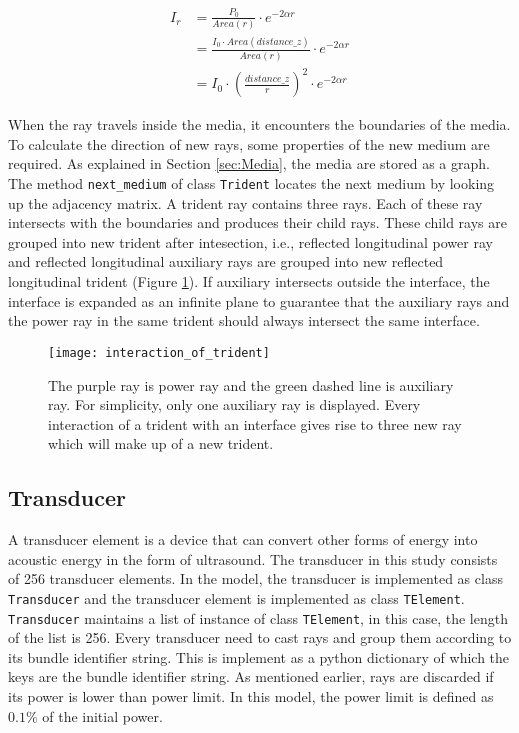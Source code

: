 \begin{equation} \label{eq:intensity_quadratically}
    \begin{aligned}
        I_r &= \frac{P_0}{Area(r)} \cdot e^{-2 \alpha r} \\
        &= \frac{I_0 \cdot Area(distance\_z)}{Area(r)} \cdot e^{-2 \alpha r} \\
        &= I_0 \cdot \left(\frac{distance\_z}{r}\right)^2 \cdot e^{-2 \alpha r}
    \end{aligned}
\end{equation}

When the ray travels inside the media, it encounters the boundaries of the media. To calculate the direction of new rays, some properties of the new medium are required. As explained in Section \ref{sec:Media}, the media are stored as a graph. The method \texttt{next\_medium} of class \texttt{Trident} locates the next medium by looking up the adjacency matrix. A trident ray contains three rays. Each of these ray intersects with the boundaries and produces their child rays. These child rays are grouped into new trident after intesection, i.e., reflected longitudinal power ray and reflected longitudinal auxiliary rays are grouped into new reflected longitudinal trident (Figure \ref{fig:interaction_of_trident}). If auxiliary intersects outside the interface, the interface is expanded as an infinite plane to guarantee that the auxiliary rays and the power ray in the same trident should always intersect the same interface.

\begin{figure}[h]
    \centering
    \texttt{[image: interaction\_of\_trident]}
    \caption{The purple ray is power ray and the green dashed line is auxiliary ray. For simplicity, only one auxiliary ray is displayed. Every interaction of a trident with an interface gives rise to three new ray which will make up of a new trident.}
    \label{fig:interaction_of_trident}
\end{figure}


\subsection{Transducer}
A transducer element is a device that can convert other forms of energy into acoustic energy in the form of ultrasound. The transducer in this study consists of 256 transducer elements. In the model, the transducer is implemented as class \texttt{Transducer} and the transducer element is implemented as class \texttt{TElement}. \texttt{Transducer} maintains a list of instance of class \texttt{TElement}, in this case, the length of the list is 256.
Every transducer need to cast rays and group them according to its bundle identifier string. This is implement as a python dictionary of which the keys are the bundle identifier string. As mentioned earlier, rays are discarded if its power is lower than power limit. In this model, the power limit is defined as $0.1\%$ of the initial power. 

